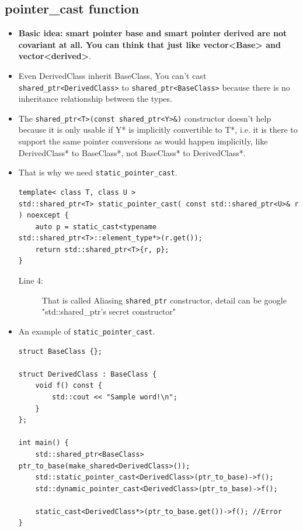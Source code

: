 \documentclass[a4paper,11pt,twoside]{book}
\begin{document}
\subsection{pointer\_cast function}
\begin{itemize}
	\item \textbf{Basic idea: smart pointer base and smart pointer derived are not covariant at all. You can think that just like vector<Base> and vector<derived>}.
			
	\item Even DerivedClass inherit BaseClass,  You can't cast \texttt{shared\_ptr<DerivedClass>} to \newline 
	\texttt{shared\_ptr<BaseClass>} because there is no inheritance relationship between the types. 
	
	\item The \texttt{shared\_ptr<T>(const shared\_ptr<Y>\&)} constructor doesn't help because it is only usable if Y* is implicitly convertible to T*, i.e. it is there to support the same pointer conversions as would happen implicitly, like DerivedClass* to BaseClass*, not BaseClass* to DerivedClass*.
	
	\item That is why we need \texttt{static\_pointer\_cast}.
\begin{lstlisting}
template< class T, class U > 
std::shared_ptr<T> static_pointer_cast( const std::shared_ptr<U>& r ) noexcept {
    auto p = static_cast<typename std::shared_ptr<T>::element_type*>(r.get());
    return std::shared_ptr<T>{r, p};
}
\end{lstlisting}
\begin{description}
	\item[Line 4:] That is called Aliasing \texttt{shared\_ptr} constructor, detail can be google "std::shared\_ptr's secret constructor"
\end{description}

	\item An example of \texttt{static\_pointer\_cast}.
\begin{lstlisting}
struct BaseClass {};

struct DerivedClass : BaseClass {
	void f() const {
		std::cout << "Sample word!\n";
	}
};

int main() {
	std::shared_ptr<BaseClass> ptr_to_base(make_shared<DerivedClass>());
	std::static_pointer_cast<DerivedClass>(ptr_to_base)->f();
	std::dynamic_pointer_cast<DerivedClass>(ptr_to_base)->f();

	static_cast<DerivedClass*>(ptr_to_base.get())->f(); //Error
}
\end{lstlisting}

\end{itemize}
\end{document}
